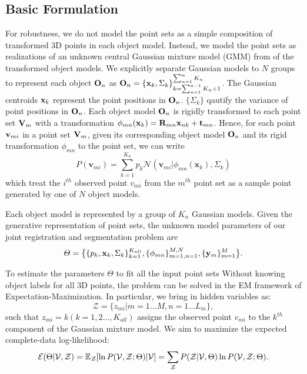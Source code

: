 \subsection{Basic Formulation}
For robustness, we do not model the point sets as a simple composition of transformed 3D points in each object model. Instead, we model the point sets as realizations of an unknown central Gaussian mixture model (GMM) from of the transformed object models. We explicitly separate Gaussian models to $N$ groups to represent each object $\mathbf{O}_{n}$ as $\mathbf{O}_{n}=\{\mathbf{x}_{k},\Sigma_{k}\}^{\sum^{n}_{n=1}K_n}_{k=\sum^{n-1}_{n=1}K_n+1}$. The Gaussian centroids $\mathbf{x}_{k}$ represent the point positions in $\mathbf{O}_{n}$. $\{\Sigma_{k}\}$ qautify the variance of point positions in $\mathbf{O}_{n}$.
Each object model $\mathbf{O}_{n}$ is rigidly transformed to each point set $\mathbf{V}_m$ with a transformation $\phi_{mn}(\mathbf{x}_{k})=\mathbf{R}_{mn}\mathbf{x}_{nk}+\mathbf{t}_{mn}$.
%
Hence, for each point $\mathbf{v}_{mi}$ in a point set $\mathbf{V}_m$, given its corresponding object model $\mathbf{O}_{n}$ and its rigid transformation $\phi_{mn}$ to the point set, we can write
\begin{equation}
\label{equ:model}
P(\pmb{v}_{mi})=\sum^{K_n}_{k=1}p_k\mathcal{N}(\pmb{v}_{mi}|\phi_{mn}(\pmb{x}_k),\Sigma_k)
\end{equation}
which treat the $i^{th}$ observed point $v_{mi}$ from the $m^{th}$ point set as a sample point generated by one of $N$ object models.

Each object model is represented by a group of $K_n$ Gaussian models.
Given the generative representation of point sets, the unknown model parameters of our joint registration and segmentation problem are
%
\begin{displaymath}
\varTheta=\big \{\{p_k,\mathbf{x}_k,\Sigma_k\}_{k=1}^{K_{all}},\{\phi_{mn}\}_{m=1,n=1}^{M,N}, \{\mathbf{y}_{m}\}^{M}_{m=1}\big\}.
\end{displaymath}
 

To estimate the parameters $\Theta$ to fit all the input point sets Without knowing object labels for all 3D points, the problem can be solved in the EM framework of Expectation-Maximization. 
%
In particular, we bring in hidden variables as: 
\begin{equation}
\mathcal{Z}=\{z_{mi}|m=1...M,n=1...L_m\},
\end{equation}
%
such that $z_{mi}=k(k=1,2...,K_{all})$ assigns the observed point $v_{mi}$ to the $k^{th}$ component of the Gaussian mixture model. 
%
We aim to maximize the expected complete-data log-likelihood:
\begin{equation}
\label{equ:obj0}
\mathcal{E}(\Theta|\mathcal{V},\mathcal{Z})=\mathbb{E}_{\mathcal{Z}}[\ln P(\mathcal{V},\mathcal{Z};\Theta)|\mathcal{V}]={\sum_{\mathcal{Z}}P(\mathcal{Z}|\mathcal{V},\Theta)\ln{P(\mathcal{V},\mathcal{Z};\Theta)}}.
\end{equation}


